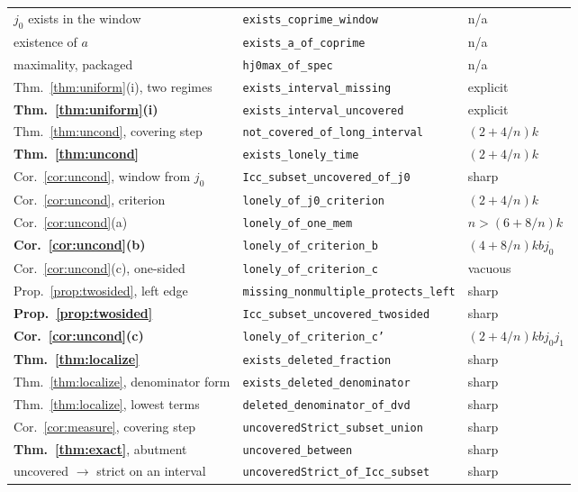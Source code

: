 \documentclass[11pt]{amsart}
\theoremstyle{plain}
\theoremstyle{definition}
\begin{document}
\begin{center}
\begin{tabular}{lll}
$j_0$ exists in the window & \texttt{exists\_coprime\_window} & n/a \\
existence of $a$ & \texttt{exists\_a\_of\_coprime} & n/a \\
maximality, packaged & \texttt{hj0max\_of\_spec} & n/a \\
Thm.~\ref{thm:uniform}(i), two regimes & \texttt{exists\_interval\_missing} & explicit \\
\textbf{Thm.~\ref{thm:uniform}(i)} & \texttt{exists\_interval\_uncovered} & explicit \\
Thm.~\ref{thm:uncond}, covering step & \texttt{not\_covered\_of\_long\_interval} & $(2{+}4/n)k$ \\
\textbf{Thm.~\ref{thm:uncond}} & \texttt{exists\_lonely\_time} & $(2{+}4/n)k$ \\
Cor.~\ref{cor:uncond}, window from $j_0$ & \texttt{Icc\_subset\_uncovered\_of\_j0} & sharp \\
Cor.~\ref{cor:uncond}, criterion & \texttt{lonely\_of\_j0\_criterion} & $(2{+}4/n)k$ \\
Cor.~\ref{cor:uncond}(a) & \texttt{lonely\_of\_one\_mem} & $n>(6{+}8/n)k$ \\
\textbf{Cor.~\ref{cor:uncond}(b)} & \texttt{lonely\_of\_criterion\_b} & $(4{+}8/n)kbj_0$ \\
Cor.~\ref{cor:uncond}(c), one-sided & \texttt{lonely\_of\_criterion\_c} & vacuous \\
Prop.~\ref{prop:twosided}, left edge & \texttt{missing\_nonmultiple\_protects\_left} & sharp \\
\textbf{Prop.~\ref{prop:twosided}} & \texttt{Icc\_subset\_uncovered\_twosided} & sharp \\
\textbf{Cor.~\ref{cor:uncond}(c)} & \texttt{lonely\_of\_criterion\_c'} & $(2{+}4/n)kbj_0j_1$ \\
\textbf{Thm.~\ref{thm:localize}} & \texttt{exists\_deleted\_fraction} & sharp \\
Thm.~\ref{thm:localize}, denominator form & \texttt{exists\_deleted\_denominator} & sharp \\
Thm.~\ref{thm:localize}, lowest terms & \texttt{deleted\_denominator\_of\_dvd} & sharp \\
Cor.~\ref{cor:measure}, covering step & \texttt{uncoveredStrict\_subset\_union} & sharp \\
\textbf{Thm.~\ref{thm:exact}}, abutment & \texttt{uncovered\_between} & sharp \\
uncovered $\to$ strict on an interval & \texttt{uncoveredStrict\_of\_Icc\_subset} & sharp \\

\end{tabular}
\end{center}
\end{document}
